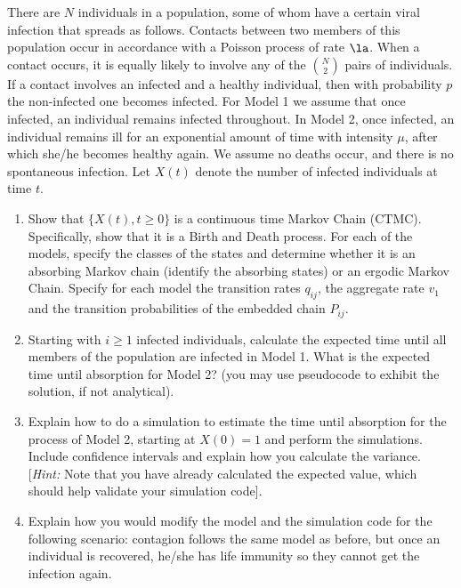 \documentclass[12pt]{article}
\begin{document}
\begin{problem} 
There are $N$ individuals in a population, some of whom have a certain
viral infection that spreads as follows. Contacts between two members of
this population occur in accordance with a Poisson process of rate
$\la$. When a contact occurs, it is equally likely to involve any of the
$N\choose2$ pairs of individuals. If a contact involves an infected and
a healthy individual, then with probability $p$ the non-infected one
becomes infected. For Model 1 we assume that once infected, an
individual remains infected throughout. In Model 2, once infected, an
individual remains ill for an exponential amount of time with intensity
$\mu$, after which she/he becomes healthy again. We assume no deaths
occur, and there is no spontaneous infection. Let $X(t)$ denote the
number of infected individuals at time $t$. 
\begin{enumerate}
\item {} Show that $\{X(t), t\ge 0\}$ is a continuous time Markov
    Chain (CTMC). Specifically, show that it is a Birth and Death
    process.  For each of the models, specify the classes of the states
    and determine whether it is an absorbing Markov chain (identify the
    absorbing states) or an ergodic Markov Chain. Specify for each model
    the transition rates $q_{ij}$, the aggregate rate $v_1$ and the
    transition probabilities of the embedded chain $P_{ij}$. 

\item {} Starting with $i\ge1$ infected individuals, calculate
    the expected time until all members of the population are infected
    in Model 1. What is the expected time until absorption for Model 2?
    (you may use pseudocode to exhibit the solution, if not analytical).

\item {}  Explain how to do a simulation to estimate the time
    until absorption for the process of Model 2, starting at $X(0)=1$
    and perform the simulations. Include confidence intervals and
    explain how you calculate the variance. [{\it Hint:} Note that you
    have already calculated the expected value, which should help
    validate your simulation code]. 

\item {}  Explain how you would modify the model and the
    simulation code for the following scenario: contagion follows the
    same model as before, but once an individual is recovered, he/she
    has life immunity so they cannot get the infection again. 
\end{enumerate}
\end{problem}
\end{document}
